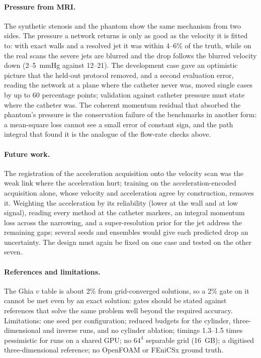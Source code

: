 \paragraph{Pressure from MRI.} The synthetic stenosis and the phantom show the same mechanism from two sides. The
pressure a network returns is only as good as the velocity it is fitted to: with exact walls and a resolved jet it
was within 4--6\% of the truth, while on the real scans the severe jets are blurred and the drop follows the
blurred velocity down (2--5~mmHg against 12--21). The development case gave an optimistic picture that the held-out
protocol removed, and a second evaluation error, reading the network at a plane where the catheter never was, moved
single cases by up to 60 percentage points; validation against catheter pressure must state where the catheter was.
The coherent momentum residual that absorbed the phantom's pressure is the conservation failure of the benchmarks in
another form: a mean-square loss cannot see a small error of constant sign, and the path integral that found it is
the analogue of the flow-rate checks above.

\paragraph{Future work.} The registration of the acceleration acquisition onto the velocity scan was the weak link
where the acceleration hurt; training on the acceleration-encoded acquisition alone, whose velocity and acceleration
agree by construction, removes it. Weighting the acceleration by its reliability (lower at the wall and at low
signal), reading every method at the catheter markers, an integral momentum loss across the narrowing, and a
super-resolution prior for the jet address the remaining gaps; several seeds and ensembles would give each predicted
drop an uncertainty. The design must again be fixed on one case and tested on the other seven.

\paragraph{References and limitations.} The Ghia $v$ table is about 2\% from grid-converged solutions, so a 2\%
gate on it cannot be met even by an exact solution: gates should be stated against references that solve the same
problem well beyond the required accuracy. Limitations: one seed per configuration; reduced budgets for the
cylinder, three-dimensional and inverse runs, and no cylinder ablation; timings 1.3--1.5 times pessimistic for runs
on a shared GPU; no $64^4$ separable grid (16~GB); a digitised three-dimensional reference; no OpenFOAM or FEniCSx
ground truth.

